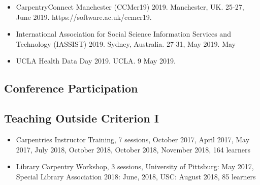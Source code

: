 \begin{itemize}[label={}]
  \item CarpentryConnect Manchester (CCMcr19) 2019. Manchester, UK. 25-27, June 2019. https://software.ac.uk/ccmcr19.
  \item International Association for Social Science Information Services and Technology (IASSIST) 2019. Sydney, Australia. 27-31, May 2019. May
  \item UCLA Health Data Day 2019. UCLA. 9 May 2019.
\end{itemize}


\subsection{Conference Participation}

\nocite{*}
\printbibliography[keyword={outlib-conf-part},title={Library-sponsored classes/workshops},heading=none]


\subsection{Teaching Outside Criterion I}
\begin{itemize}[label={}]
  \item Carpentries Instructor Training, 7 sessions,  October	2017, April	2017, May	2017, July	2018, October	2018, October	2018, November	2018,	164 learners
  \item Library Carpentry Workshop, 3 sessions, University of Pittsburg: May	2017, Special Library Association 2018: June, 2018, USC: August	2018,	85 learners
\end{itemize}
